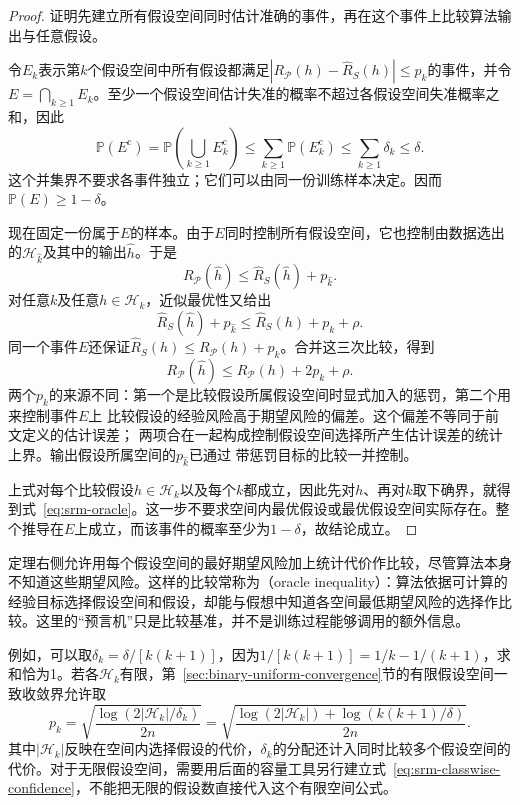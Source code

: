 \begin{proof}
证明先建立所有假设空间同时估计准确的事件，再在这个事件上比较算法输出与任意假设。

令$E_k$表示第$k$个假设空间中所有假设都满足$|R_{\mathcal P}(h)-\hat R_S(h)|\leq p_k$的事件，并令$E=\bigcap_{k\geq1}E_k$。至少一个假设空间估计失准的概率不超过各假设空间失准概率之和，因此
\[
 \mathbb P(E^{\mathrm c})
 =\mathbb P\left(\bigcup_{k\geq1}E_k^{\mathrm c}\right)
 \leq\sum_{k\geq1}\mathbb P(E_k^{\mathrm c})
 \leq\sum_{k\geq1}\delta_k\leq\delta.
\]
这个并集界不要求各事件独立；它们可以由同一份训练样本决定。因而$\mathbb P(E)\geq1-\delta$。

现在固定一份属于$E$的样本。由于$E$同时控制所有假设空间，它也控制由数据选出的$\mathcal H_{\hat k}$及其中的输出$\hat h$。于是
\[
 R_{\mathcal P}(\hat h)\leq\hat R_S(\hat h)+p_{\hat k}.
\]
对任意$k$及任意$h\in\mathcal H_k$，近似最优性又给出
\[
 \hat R_S(\hat h)+p_{\hat k}
 \leq\hat R_S(h)+p_k+\rho.
\]
同一个事件$E$还保证$\hat R_S(h)\leq R_{\mathcal P}(h)+p_k$。合并这三次比较，得到
\[
 R_{\mathcal P}(\hat h)
 \leq R_{\mathcal P}(h)+2p_k+\rho.
\]
两个$p_k$的来源不同：第一个是比较假设所属假设空间时显式加入的惩罚，第二个用来控制事件$E$上
比较假设的经验风险高于期望风险的偏差。这个偏差不等同于前文定义的估计误差；
两项合在一起构成控制假设空间选择所产生估计误差的统计上界。输出假设所属空间的$p_{\hat k}$已通过
带惩罚目标的比较一并控制。

上式对每个比较假设$h\in\mathcal H_k$以及每个$k$都成立，因此先对$h$、再对$k$取下确界，就得到式~\eqref{eq:srm-oracle}。这一步不要求空间内最优假设或最优假设空间实际存在。整个推导在$E$上成立，而该事件的概率至少为$1-\delta$，故结论成立。
\end{proof}

定理右侧允许用每个假设空间的最好期望风险加上统计代价作比较，尽管算法本身不知道这些期望风险。这样的比较常称为（oracle inequality）：算法依据可计算的经验目标选择假设空间和假设，却能与假想中知道各空间最低期望风险的选择作比较。这里的“预言机”只是比较基准，并不是训练过程能够调用的额外信息。

例如，可以取$\delta_k=\delta/[k(k+1)]$，因为$1/[k(k+1)]=1/k-1/(k+1)$，求和恰为1。若各$\mathcal H_k$有限，第~\ref{sec:binary-uniform-convergence}节的有限假设空间一致收敛界允许取
\[
 p_k=\sqrt{\frac{\log(2|\mathcal H_k|/\delta_k)}{2n}}
 =\sqrt{\frac{\log(2|\mathcal H_k|)+\log(k(k+1)/\delta)}{2n}}.
\]
其中$|\mathcal H_k|$反映在空间内选择假设的代价，$\delta_k$的分配还计入同时比较多个假设空间的代价。对于无限假设空间，需要用后面的容量工具另行建立式~\eqref{eq:srm-classwise-confidence}，不能把无限的假设数直接代入这个有限空间公式。


